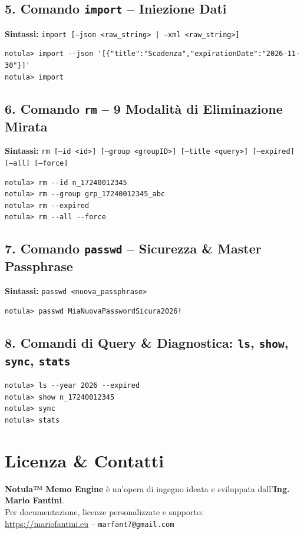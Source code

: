 \documentclass[11pt,a4paper]{article}
\begin{document}
\subsection{5. Comando \texttt{import} -- Iniezione Dati}
\textbf{Sintassi:} \texttt{import [--json <raw_string> | --xml <raw_string>]}
\begin{lstlisting}[style=notulacli]
notula> import --json '[{"title":"Scadenza","expirationDate":"2026-11-30"}]'
notula> import
\end{lstlisting}

\subsection{6. Comando \texttt{rm} -- 9 Modalità di Eliminazione Mirata}
\textbf{Sintassi:} \texttt{rm [--id <id>] [--group <groupID>] [--title <query>] [--expired] [--all] [--force]}
\begin{lstlisting}[style=notulacli]
notula> rm --id n_17240012345
notula> rm --group grp_17240012345_abc
notula> rm --expired
notula> rm --all --force
\end{lstlisting}

\subsection{7. Comando \texttt{passwd} -- Sicurezza \& Master Passphrase}
\textbf{Sintassi:} \texttt{passwd <nuova_passphrase>}
\begin{lstlisting}[style=notulacli]
notula> passwd MiaNuovaPasswordSicura2026!
\end{lstlisting}

\subsection{8. Comandi di Query \& Diagnostica: \texttt{ls}, \texttt{show}, \texttt{sync}, \texttt{stats}}
\begin{lstlisting}[style=notulacli]
notula> ls --year 2026 --expired
notula> show n_17240012345
notula> sync
notula> stats
\end{lstlisting}

\section{Licenza \& Contatti}
\textbf{Notula™ Memo Engine} è un'opera di ingegno ideata e sviluppata dall'\textbf{Ing. Mario Fantini}.\\
Per documentazione, licenze personalizzate e supporto:\\
\href{https://mariofantini.eu}{https://mariofantini.eu} -- \texttt{marfant7@gmail.com}
\end{document}
